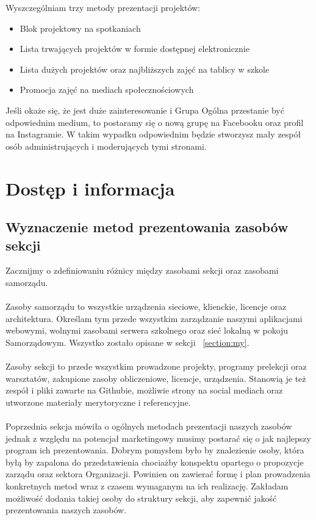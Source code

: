 \documentclass[9pt,a4paper]{report}
\begin{document}
Wyszczególniam trzy metody prezentacji projektów:\\ 

\begin{itemize} 

\item Blok projektowy na spotkaniach 
\item Lista trwających projektów w formie dostępnej elektronicznie 
\item Lista dużych projektów oraz najbliższych zajęć na tablicy w szkole 
\item Promocja zajęć na mediach społecznościowych 
\end{itemize} 

Jeśli okaże się, że jest duże zainteresowanie i Grupa Ogólna przestanie być odpowiednim medium, to postaramy się o nową grupę na Facebooku oraz profil na Instagramie. W takim wypadku odpowiednim będzie stworzysz mały zespół osób administrujących i moderujących tymi stronami. 

\chapter{Dostęp i informacja} 

\section{Wyznaczenie metod prezentowania zasobów sekcji} 

Zacznijmy o zdefiniowaniu różnicy między zasobami sekcji oraz zasobami samorządu.\\\\ 
Zasoby samorządu to wszystkie urządzenia sieciowe, klienckie, licencje oraz architektura. Określam tym przede wszystkim zarządzanie naszymi aplikacjami webowymi, wolnymi zasobami serwera szkolnego oraz sieć lokalną w pokoju Samorządowym. Wszystko zostało opisane w sekcji ~\ref{section:my}.\\\\ 

Zasoby sekcji to przede wszystkim prowadzone projekty, programy prelekcji oraz warsztatów, zakupione zasoby obliczeniowe, licencje, urządzenia. Stanowią je też zespół i pliki zawarte na Githubie, możliwie strony na social mediach oraz utworzone materiały merytoryczne i referencyjne.\\\\ 

Poprzednia sekcja mówiła o ogólnych metodach prezentacji naszych zasobów jednak z względu na potencjał marketingowy musimy postarać się o jak najlepszy program ich prezentowania. Dobrym pomysłem było by znalezienie osoby, która byłą by zapalona do przedstawienia chociażby konspektu opartego o propozycje zarządu oraz sektora Organizacji. Powinien on zawierać formę i plan prowadzenia konkretnych metod wraz z czasem wymaganym na ich realizację. Zakładam możliwość dodania takiej osoby do struktury sekcji, aby zapewnić jakość prezentowania naszych zasobów.\\ 
\end{document}
